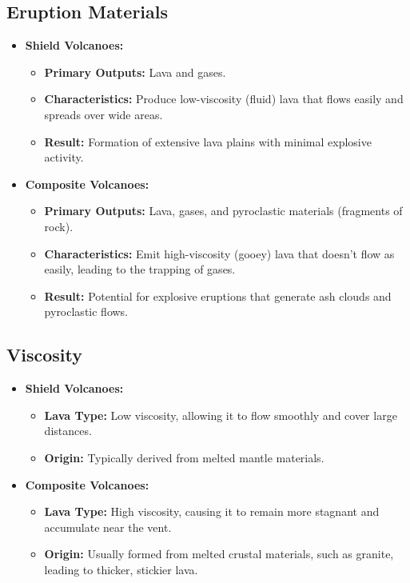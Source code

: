 \documentclass{article}
\begin{document}
\subsection{Eruption Materials}
\begin{itemize}[leftmargin=*, label={--}]
    \item \textbf{Shield Volcanoes:}
    \begin{itemize}[leftmargin=*, label={$\bullet$}]
        \item \textbf{Primary Outputs:} Lava and gases.
        \item \textbf{Characteristics:} Produce low-viscosity (fluid) lava that flows easily and spreads over wide areas.
        \item \textbf{Result:} Formation of extensive lava plains with minimal explosive activity.
    \end{itemize}
    
    \item \textbf{Composite Volcanoes:}
    \begin{itemize}[leftmargin=*, label={$\bullet$}]
        \item \textbf{Primary Outputs:} Lava, gases, and pyroclastic materials (fragments of rock).
        \item \textbf{Characteristics:} Emit high-viscosity (gooey) lava that doesn’t flow as easily, leading to the trapping of gases.
        \item \textbf{Result:} Potential for explosive eruptions that generate ash clouds and pyroclastic flows.
    \end{itemize}
\end{itemize}

\subsection{Viscosity}
\begin{itemize}[leftmargin=*, label={--}]
    \item \textbf{Shield Volcanoes:}
    \begin{itemize}[leftmargin=*, label={$\bullet$}]
        \item \textbf{Lava Type:} Low viscosity, allowing it to flow smoothly and cover large distances.
        \item \textbf{Origin:} Typically derived from melted mantle materials.
    \end{itemize}
    
    \item \textbf{Composite Volcanoes:}
    \begin{itemize}[leftmargin=*, label={$\bullet$}]
        \item \textbf{Lava Type:} High viscosity, causing it to remain more stagnant and accumulate near the vent.
        \item \textbf{Origin:} Usually formed from melted crustal materials, such as granite, leading to thicker, stickier lava.
    \end{itemize}
\end{itemize}
\end{document}
